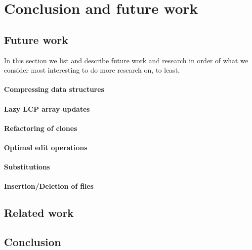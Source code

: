 \chapter{Conclusion and future work}

\section{Future work}

In this section we list and describe future work and research in order of what we consider
most interesting to do more research on, to least.

\subsubsection{Compressing data structures}

\subsubsection{Lazy LCP array updates}

\subsubsection{Refactoring of clones}

\subsubsection{Optimal edit operations}

\subsubsection{Substitutions}

\subsubsection{Insertion/Deletion of files}

\section{Related work}


\section{Conclusion}
